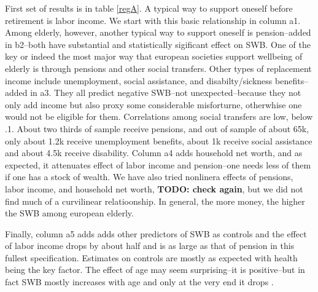 \documentclass[10pt, letterpaper]{article}
\begin{document}
\begin{spacing}{1.4}
First set of results is in table \ref{regA}. A typical way to support oneself
before retirement is labor
income. We start with this basic relationship in column a1. Among elderly,
however, another typical way to support oneself is pension--added in b2--both
have substantial and statistically sigificant effect on SWB. 
%
One of the key or indeed the most major way that european societies support
wellbeing of elderly is through pensions and other social transfers.
%
Other types of replacement income include unemployment, social assistance, and disabilty/sickness
benefits--added in a3. They all predict negative SWB--not unexpected--because
they not only add income but also proxy some considerable misforturne,
otherwhise one would not be eligible for them. 
%
Correlations among social transfers are low, below .1. About two thirds of
sample receive pensions, and out of sample of about 65k, only about 1.2k receive
unemployment benefits,  about 1k receive social assistance and about 4.5k
receive disability.
%
Column a4 adds household net
worth, and as expected, it attenuates effect of labor income and pension--one
needs less of them if one has a stock of wealth. 
%
We have also tried nonlinera effects of pensions, labor income, and household
net worth, \textbf{TODO: check again}, but we did not find much of a curvilinear
relatioonship. In general, the more money,  the higher the SWB  among european elderly.

Finally, column a5 adds adds
other predictors of SWB as controls and the effect of labor income drops by
about half
and is as large as that of pension in this fullest specification.
%
Estimates on controls are mostly as expected with health being the key
factor. The effect of age may seem surprising--it is  positive--but in fact SWB mostly
increases with age and only at the very end it drops \citep{gwozdz10}.



\end{spacing}
\end{document}
